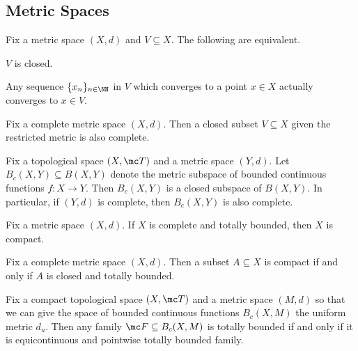 \documentclass{article}
\begin{document}
\subsection{Metric Spaces}
\begin{lemma} \label{lem:metricclosed}
	Fix a metric space $(X,d)$ and $V\subseteq X$. The following are equivalent.
	\begin{listalph}
		\item $V$ is closed.
		\item Any sequence $\{x_n\}_{n\in\NN}$ in $V$ which converges to a point $x\in X$ actually converges to $x\in V$.
	\end{listalph}
\end{lemma}
\begin{corollary} \label{cor:closediscomplete}
	Fix a complete metric space $(X,d)$. Then a closed subset $V\subseteq X$ given the restricted metric is also complete.
\end{corollary}
\begin{proposition} \label{prop:contiscomplete}
	Fix a topological space $(X,\mc T)$ and a metric space $(Y,d)$. Let $B_c(X,Y)\subseteq B(X,Y)$ denote the metric subspace of bounded continuous functions $f\colon X\to Y$. Then $B_c(X,Y)$ is a closed subspace of $B(X,Y)$. In particular, if $(Y,d)$ is complete, then $B_c(X,Y)$ is also complete.
\end{proposition}
\begin{theorem} \label{thm:metric-compact}
	Fix a metric space $(X,d)$. If $X$ is complete and totally bounded, then $X$ is compact.
\end{theorem}
\begin{corollary} \label{cor:metric-compact}
	Fix a complete metric space $(X,d)$. Then a subset $A\subseteq X$ is compact if and only if $A$ is closed and totally bounded.
\end{corollary}
\begin{theorem} \label{thm:ascoli}
	Fix a compact topological space $(X,\mc T)$ and a metric space $(M,d)$ so that we can give the space of bounded continuous functions $B_c(X,M)$ the uniform metric $d_u$. Then any family $\mc F\subseteq B_c(X,M)$ is totally bounded if and only if it is equicontinuous and pointwise totally bounded family.
\end{theorem}
\end{document}
